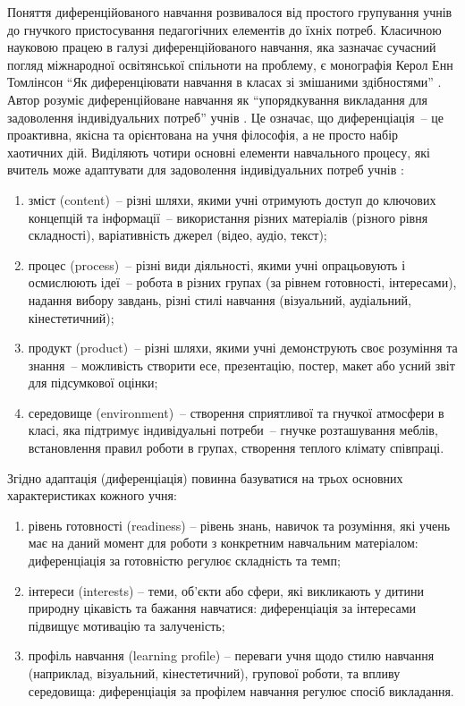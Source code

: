 Поняття диференційованого навчання розвивалося від простого групування учнів до гнучкого пристосування педагогічних елементів до їхніх потреб. Класичною науковою працею в галузі диференційованого навчання, яка зазначає сучасний погляд міжнародної освітянської спільноти на проблему, є монографія Керол Енн Томлінсон ``Як диференціювати навчання в класах зі змішаними здібностями''  \cite{Tomlinson2001}. Автор розуміє диференційоване навчання як ``упорядкування викладання для задоволення індивідуальних потреб'' учнів \cite{Tomlinson2001}. Це означає, що диференціація~-- це проактивна, якісна та орієнтована на учня філософія, а не просто набір хаотичних дій. Виділяють чотири основні елементи навчального процесу, які вчитель може адаптувати для задоволення індивідуальних потреб учнів \cite{Tomlinson2001}: 
\begin{enumerate} [label=\arabic*)]%
\item зміст (content)~-- різні шляхи, якими учні отримують доступ до ключових концепцій та інформації~-- використання різних матеріалів (різного рівня складності), варіативність джерел (відео, аудіо, текст);
\item процес (process)~-- різні види діяльності, якими учні опрацьовують і осмислюють ідеї~-- робота в різних групах (за рівнем готовності, інтересами), надання вибору завдань, різні стилі навчання (візуальний, аудіальний, кінестетичний);
\item продукт (product)~-- різні шляхи, якими учні демонструють своє розуміння та знання~-- можливість створити есе, презентацію, постер, макет або усний звіт для підсумкової оцінки;
\item середовище (environment)~-- створення сприятливої та гнучкої атмосфери в класі, яка підтримує індивідуальні потреби~-- гнучке розташування меблів, встановлення правил роботи в групах, створення теплого клімату співпраці.
\end{enumerate}

Згідно \cite{Tomlinson2001} адаптація (диференціація) повинна базуватися на трьох основних характеристиках кожного учня:
\begin{enumerate} [label=\arabic*)]%
\item
рівень готовності (readiness) -- рівень знань, навичок та розуміння, які учень має на даний момент для роботи з конкретним навчальним матеріалом: диференціація за готовністю регулює складність та темп;
\item
інтереси (interests) -- теми, об'єкти або сфери, які викликають у дитини природну цікавість та бажання навчатися: диференціація за інтересами підвищує мотивацію та залученість;
\item
профіль навчання (learning profile) -- переваги учня щодо стилю навчання (наприклад, візуальний, кінестетичний), групової роботи, та впливу середовища: диференціація за профілем навчання регулює спосіб викладання.
\end{enumerate}

